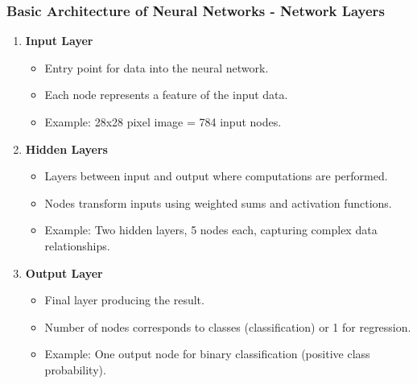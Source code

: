 \documentclass[aspectratio=169]{beamer}
\begin{document}
\begin{frame}[fragile]
    \frametitle{Basic Architecture of Neural Networks - Network Layers}
    \begin{enumerate}
        \item \textbf{Input Layer}
            \begin{itemize}
                \item Entry point for data into the neural network.
                \item Each node represents a feature of the input data.
                \item Example: 28x28 pixel image = 784 input nodes.
            \end{itemize}

        \item \textbf{Hidden Layers}
            \begin{itemize}
                \item Layers between input and output where computations are performed.
                \item Nodes transform inputs using weighted sums and activation functions.
                \item Example: Two hidden layers, 5 nodes each, capturing complex data relationships.
            \end{itemize}

        \item \textbf{Output Layer}
            \begin{itemize}
                \item Final layer producing the result.
                \item Number of nodes corresponds to classes (classification) or 1 for regression.
                \item Example: One output node for binary classification (positive class probability).
            \end{itemize}
    \end{enumerate}
\end{frame}
\end{document}
